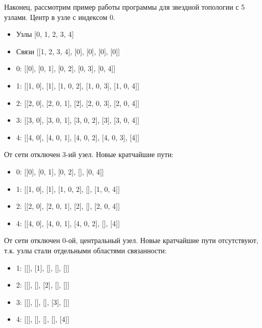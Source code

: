 Наконец, рассмотрим пример работы программы для звездной топологии с 5 узлами. Центр в узле с индексом 0.

\begin{itemize}
	\item Узлы [0, 1, 2, 3, 4]
	\item Связи [[1, 2, 3, 4], [0], [0], [0], [0]]
\end{itemize}

\begin{itemize}
	\item 0: [[0], [0, 1], [0, 2], [0, 3], [0, 4]]
	\item 1: [[1, 0], [1], [1, 0, 2], [1, 0, 3], [1, 0, 4]]
	\item 2: [[2, 0], [2, 0, 1], [2], [2, 0, 3], [2, 0, 4]]
	\item 3: [[3, 0], [3, 0, 1], [3, 0, 2], [3], [3, 0, 4]]
    \item 4: [[4, 0], [4, 0, 1], [4, 0, 2], [4, 0, 3], [4]]
\end{itemize}

От сети отключен 3-ий узел. Новые кратчайшие пути:
\begin{itemize}
	\item 0: [[0], [0, 1], [0, 2], [], [0, 4]]
	\item 1: [[1, 0], [1], [1, 0, 2], [], [1, 0, 4]]
	\item 2: [[2, 0], [2, 0, 1], [2], [], [2, 0, 4]]
	\item 4: [[4, 0], [4, 0, 1], [4, 0, 2], [], [4]]
\end{itemize}

От сети отключен 0-ой, центральный узел. Новые кратчайшие пути отсутствуют, т.к. узлы стали отдельными областями связанности:
\begin{itemize}
	\item 1: [[], [1], [], [], []]
	\item 2: [[], [], [2], [], []]
	\item 3: [[], [], [], [3], []]
    \item 4: [[], [], [], [], [4]]
\end{itemize}
